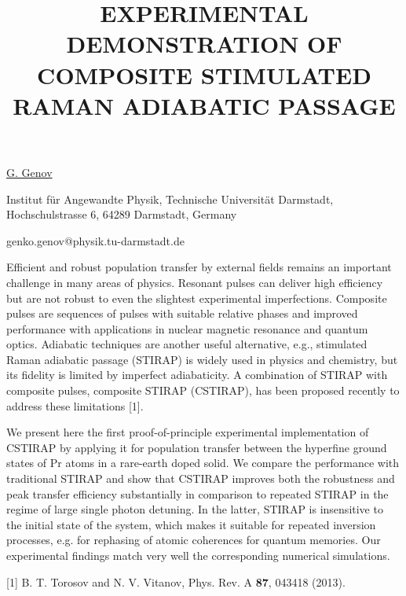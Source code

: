 \title{EXPERIMENTAL DEMONSTRATION OF COMPOSITE STIMULATED RAMAN ADIABATIC PASSAGE}

\underline{G. Genov} 

{\normalsize{\vspace{-4mm}
Institut f\"ur Angewandte Physik, Technische Universität Darmstadt, Hochschulstrasse 6, 64289 Darmstadt, Germany

\email genko.genov@physik.tu-darmstadt.de}}

Efficient and robust population transfer by external fields remains an important challenge in many areas of physics. Resonant pulses can deliver high efficiency but are not robust to even the slightest experimental imperfections. Composite pulses are sequences of pulses with suitable relative phases and improved performance with applications in nuclear magnetic resonance and quantum optics. Adiabatic techniques are another useful alternative, e.g., stimulated Raman adiabatic passage (STIRAP) is widely used in physics and chemistry, but its fidelity is limited by imperfect adiabaticity. A combination of STIRAP with composite pulses, composite STIRAP (CSTIRAP), has been proposed recently to address these limitations [1].

We present here the first proof-of-principle experimental implementation of CSTIRAP by applying it for population transfer between the hyperfine ground states of Pr atoms in a rare-earth doped solid. We compare the performance with traditional STIRAP and show that CSTIRAP improves both the robustness and peak transfer efficiency substantially in comparison to repeated STIRAP in the regime of large single photon detuning. In the latter, STIRAP is insensitive to the initial state of the system, which makes it suitable for repeated inversion processes, e.g. for rephasing of atomic coherences for quantum memories. Our experimental findings match very well the corresponding numerical simulations.

{\normalsize
[1] B. T. Torosov and N. V. Vitanov, Phys. Rev. A \textbf{87}, 043418 (2013).
}

\vspace{\baselineskip}